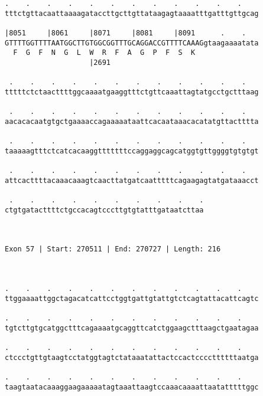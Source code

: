 \documentclass{article}
\begin{document}
\begin{Verbatim}
.    .    .    .    .    .    .    .    .    .    .    .    
tttctgttacaattaaaagataccttgcttgttataagagtaaaatttgatttgttgcag
                                                            
|8051     |8061     |8071     |8081     |8091      .    .   
GTTTTGGTTTTAATGGCTTGTGGCGGTTTGCAGGACCGTTTTCAAAGgtaagaaaatata
  F  G  F  N  G  L  W  R  F  A  G  P  F  S  K               
                    |2691                                   
  
 .    .    .    .    .    .    .    .    .    .    .    .   
tttttctctaacttttggcaaaatgaaggtttctgttcaaattagtatgcctgctttaag
                                                            
 .    .    .    .    .    .    .    .    .    .    .    .   
aacacacaatgtgctgaaaaccagaaaaataattcacaataaacacatatgttactttta
                                                            
 .    .    .    .    .    .    .    .    .    .    .    .   
taaaaagtttctcatcacaaggtttttttccaggaggcagcatggtgttggggtgtgtgt
                                                            
 .    .    .    .    .    .    .    .    .    .    .    .   
attcacttttacaaacaaagtcaacttatgatcaatttttcagaagagtatgataaacct
                                                            
 .    .    .    .    .    .    .    .    .    .
ctgtgatacttttctgccacagtcccttgtgtatttgataatcttaa
                                               
                                               
 
Exon 57 | Start: 270511 | End: 270727 | Length: 216



.    .    .    .    .    .    .    .    .    .    .    .    
ttggaaaattggctagacatcattcctggtgattgtattgtctcagtattacattcagtc
                                                            
.    .    .    .    .    .    .    .    .    .    .    .    
tgtcttgtgcatggctttcagaaaatgcaggttcatctggaagctttaagctgaatagaa
                                                            
.    .    .    .    .    .    .    .    .    .    .    .    
ctccctgttgtaagtcctatggtagtctataaatattactccactccccttttttaatga
                                                            
.    .    .    .    .    .    .    .    .    .    .    .    
taagtaatacaaaggaagaaaaatagtaaattaagtccaaacaaaattaatatttttggc
                                                            

\end{Verbatim}
\end{document}
